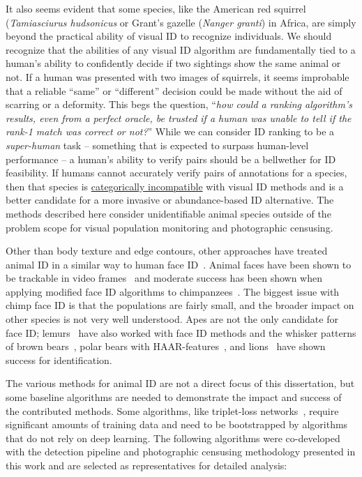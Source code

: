 It also seems evident that some species, like the American red squirrel (\textit{Tamiasciurus hudsonicus} or Grant's gazelle (\textit{Nanger granti}) in Africa, are simply beyond the practical ability of visual ID to recognize individuals.  We should recognize that the abilities of any visual ID algorithm are fundamentally tied to a human's ability to confidently decide if two sightings show the same animal or not.  If a human was presented with two images of squirrels, it seems improbable that a reliable ``same'' or ``different'' decision could be made without the aid of scarring or a deformity.  This begs the question, ``\textit{how could a ranking algorithm's results, even from a perfect oracle, be trusted if a human was unable to tell if the rank-1 match was correct or not?}''  While we can consider ID ranking to be a \textit{super-human} task -- something that is expected to surpass human-level performance -- a human's ability to verify pairs should be a bellwether for ID feasibility.  If humans cannot accurately verify pairs of annotations for a species, then that species is \underline{categorically incompatible} with visual ID methods and is a better candidate for a more invasive or abundance-based ID alternative.  The methods described here consider unidentifiable animal species outside of the problem scope for visual population monitoring and photographic censusing.

Other than body texture and edge contours, other approaches have treated animal ID in a similar way to human face ID~\cite{winckler_comparison_2005}.  Animal faces have been shown to be trackable in video frames~\cite{burghardt_tracking_2004,burghardt_analysing_2006} and moderate success has been shown when applying modified face ID algorithms to chimpanzees~\cite{deb_face_2018,freytag_chimpanzee_2016, schofield_chimpanzee_2019}.  The biggest issue with chimp face ID is that the populations are fairly small, and the broader impact on other species is not very well understood.  Apes are not the only candidate for face ID; lemurs~\cite{crouse_lemurfaceid_2017} have also worked with face ID methods and the whisker patterns of brown bears~\cite{clapham_automated_2020}, polar bears with HAAR-features~\cite{lienhart_extended_2002, mita_joint_2005}, and lions~\cite{kerr_facebook_2015} have shown success for identification.

The various methods for animal ID are not a direct focus of this dissertation, but some baseline algorithms are needed to demonstrate the impact and success of the contributed methods.  Some algorithms, like triplet-loss networks~\cite{dong_triplet_2018,hermans_defense_2017,schroff_facenet_2015}, require significant amounts of training data and need to be bootstrapped by algorithms that do not rely on deep learning.  The following algorithms were co-developed with the detection pipeline and photographic censusing methodology presented in this work and are selected as representatives for detailed analysis:

